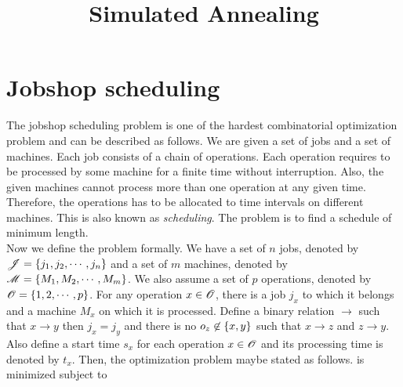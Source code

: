 \documentclass[letterpaper,english,10pt]{article}
\title{Simulated Annealing}
\begin{document}
\maketitle

\section{Jobshop scheduling}
The jobshop scheduling problem is one of the hardest combinatorial optimization problem and can be described as follows.
We are given a set of jobs and a set of machines. 
Each job consists of a chain of operations. 
Each operation requires to be processed by some machine for a finite time without interruption. 
Also, the given machines cannot process more than one operation at any given time.
Therefore, the operations has to be allocated to time intervals on different machines. This is also known as \emph{scheduling}.
The problem is to find a schedule of minimum length.\\

Now we define the problem formally.
We have a set of $n$ jobs, denoted by $\mathscr{J} = \left\{j_1,j_2,\cdots,j_n\right\}$ and a set of $m$ machines, denoted by $\mathscr{M} = \left\{M_1,M_2,\cdots,M_m\right\}$.
We also assume a set of $p$ operations, denoted by $\mathscr{O} = \left\{1,2,\cdots,p\right\}$.
For any operation $x \in \mathscr{O}$, there is a job $j_x$ to which it belongs and a machine $M_x$ on which it is processed. 
Define a binary relation $\rightarrow$ such that $x \rightarrow y$ then $j_x = j_y$ and there is no $o_z \not\in \left\{x,y\right\}$ such that $x \rightarrow z$ and $z \rightarrow y$.
Also define a start time $s_x$ for each operation $x \in \mathscr{O}$ and its processing time is denoted by $t_x$.
Then, the optimization problem maybe stated as follows.
is minimized subject to 
\end{document}
